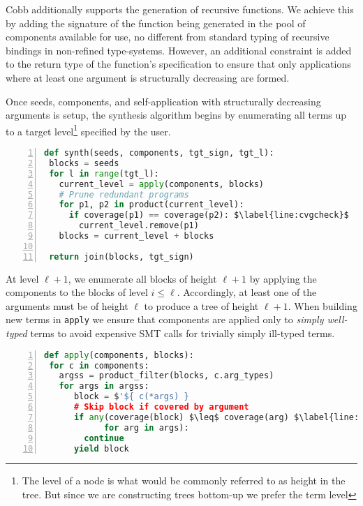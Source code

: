 \documentclass[review, sigplan]{acmart}
\begin{document}

Cobb additionally supports the generation of recursive functions.
We achieve this by adding the signature of the function being
generated in the pool of components available for use,
no different from standard typing of recursive bindings in non-refined
type-systems.
However, an additional constraint is added to the return type
of the function's specification to ensure that only applications
where at least one argument is structurally decreasing are formed.


Once seeds, components, and self-application with structurally decreasing
arguments is setup, the synthesis algorithm begins by enumerating
all terms up to a target level\footnote{The level of a node is what would
  be commonly referred to as height in the tree. But since
  we are constructing trees bottom-up we prefer the term level} specified by the user.
\begin{lstlisting}[language=Python, basicstyle=\small\ttfamily, mathescape, numbers=left, numbersep=3pt]
def synth(seeds, components, tgt_sign, tgt_l):
 blocks = seeds
 for l in range(tgt_l):
   current_level = apply(components, blocks)
   # Prune redundant programs
   for p1, p2 in product(current_level):
     if coverage(p1) == coverage(p2): $\label{line:cvgcheck}$
       current_level.remove(p1)
   blocks = current_level + blocks

 return join(blocks, tgt_sign)
\end{lstlisting}
At level $\ell + 1$, we enumerate all blocks of height $\ell + 1$ by applying
the components to the blocks of level $i \leq \ell$.
Accordingly, at least one of the arguments must be of height $\ell$ to produce
a tree of height $\ell + 1$.
When building new terms in \lstinline[basicstyle=\small\ttfamily]|apply|
we ensure that components are applied only to \emph{simply well-typed} terms
to avoid expensive SMT calls for trivially simply ill-typed terms.

\begin{lstlisting}[language=Python, basicstyle=\small\ttfamily, mathescape, numbers=left, numbersep=3pt]
def apply(components, blocks):
 for c in components:
   argss = product_filter(blocks, c.arg_types)
   for args in argss:
      block = $'${ c(*args) }
      # Skip block if covered by argument
      if any(coverage(block) $\leq$ coverage(arg) $\label{line:cvginc}$
            for arg in args):
        continue
      yield block
\end{lstlisting}
\end{document}
